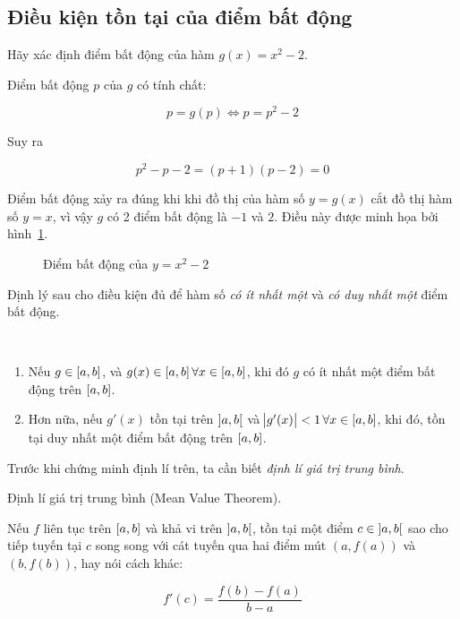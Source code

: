 \documentclass[../../Lectures.tex]{subfiles}
\begin{document}
\subsection{Điều kiện tồn tại của điểm bất động}

\begin{exmp}
    Hãy xác định điểm bất động của hàm \(g(x) = x^2 - 2\).

    Điểm bất động \(p\) của \(g\) có tính chất:

    \[p= g(p) \iff p = p^2 - 2\]

    Suy ra

    \[p^2 - p - 2 = (p + 1)(p - 2) = 0\]

    Điểm bất động xảy ra đúng khi khi đồ thị của hàm số \(y = g(x)\) cắt đồ thị
    hàm số \(y = x\), vì vậy \(g\) có 2 điểm bất động là \(-1\) và \(2\). Điều
    này được minh họa bởi hình~\ref{fig:exmp_2.2_fixed_point}.

    \begin{figure}[!h]
        \centering
        
        \caption{Điểm bất động của \(y = x^2 - 2\)}
        \label{fig:exmp_2.2_fixed_point}
    \end{figure}
\end{exmp}

Định lý sau cho điều kiện đủ để hàm số \emph{có ít nhất một} và \emph{có duy
nhất một} điểm bất động.

\begin{theorem}\label{thm:sufficient_conditions_of_fixed_point}
\phantom\\
\begin{enumerate}
    \item Nếu \(g \in \interval{a}{b}\), và \(g(x) \in \interval{a}{b} \,
        \forall x \in \interval{a}{b}\), khi đó \(g\) có ít nhất một điểm bất
        động trên \(\interval{a}{b}\).
    \item Hơn nữa, nếu \(g'(x)\) tồn tại trên \(\interval[open]{a}{b}\) và
        \(\abs{g'(x)} < 1 \, \forall x \in \interval{a}{b}\), khi đó, tồn tại
        duy nhất một điểm bất động trên \(\interval{a}{b}\).
\end{enumerate}
\end{theorem}

Trước khi chứng minh định lí trên, ta cần biết \emph{định lí giá trị trung
bình}.

\begin{theorem}\label{thm:mean_value_theorem}
    Định lí giá trị trung bình (Mean Value Theorem).

    Nếu \(f\) liên tục trên \(\interval{a}{b}\) và khả vi trên
    \(\interval[open]{a}{b}\), tồn tại một điểm \(c \in \interval[open]{a}{b}\)
    sao cho tiếp tuyến tại \(c\) song song với cát tuyến qua hai điểm mút \((a,
    f(a))\) và \((b, f(b))\), hay nói cách khác:

    \[f'(c) = \frac{f(b) - f(a)}{b - a}\]
\end{theorem}
\end{document}
